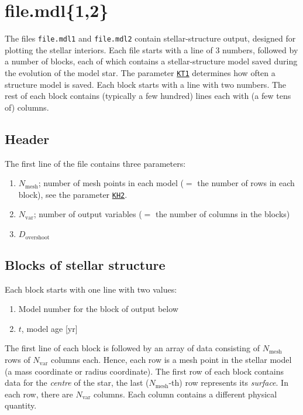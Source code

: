\section{file.mdl\{1,2\}}

The files \texttt{file.mdl1} and \texttt{file.mdl2} contain stellar-structure output, designed for plotting
the stellar interiors.
Each file starts with a line of 3 numbers, followed by a number of blocks, each of which contains a
stellar-structure model saved during the evolution of the model star.  The parameter \hyperlink{kt1}{\texttt{KT1}}
determines how often a structure model is saved.
Each block starts with a line with two numbers. The rest of each block contains (typically a few hundred) 
lines each with (a few tens of) columns.



\subsection{Header}
The first line of the file contains three parameters:
\begin{enumerate}
\item $N_\mathrm{mesh}$; number of mesh points in each model ($=$ the number of rows in each block), see the parameter \hyperlink{kh2}{\texttt{KH2}}.
\item $N_\mathrm{var}$; number of output variables ($=$ the number of columns in the blocks)
\item $D_\mathrm{overshoot}$ 
\end{enumerate}



\subsection{Blocks of stellar structure}
Each block starts with one line with two values:
\begin{enumerate}
\item Model number for the block of output below
\item $t$, model age [yr]
\end{enumerate}


The first line of each block is followed by an array of data consisting of $N_\mathrm{mesh}$ rows of $N_\mathrm{var}$ columns 
each.  Hence, each row is a mesh point in the stellar model (a mass coordinate or radius coordinate).  The first row of each
block contains data for the \emph{centre} of the star, the last ($N_\mathrm{mesh}$-th) row represents its \emph{surface}.
In each row, there are $N_\mathrm{var}$ columns.  Each column contains a different physical quantity.  

